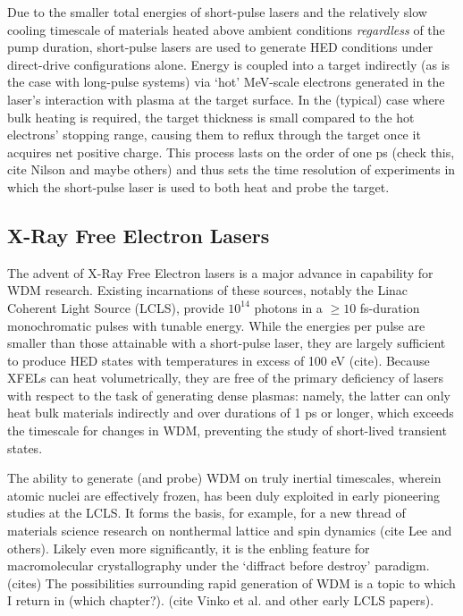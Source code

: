 Due to the smaller total energies of short-pulse lasers and the relatively slow cooling timescale of materials heated above ambient conditions \textit{regardless} of the pump duration, short-pulse lasers are used to generate HED conditions under direct-drive configurations alone. Energy is coupled into a target indirectly (as is the case with long-pulse systems) via `hot' MeV-scale electrons generated in the laser's interaction with plasma at the target surface. In the (typical) case where bulk heating is required, the target thickness is small compared to the hot electrons' stopping range, causing them to reflux through the target once it acquires net positive charge. This process lasts on the order of one ps (check this, cite Nilson and maybe others) and thus sets the time resolution of experiments in which the short-pulse laser is used to both heat and probe the target.

\label{foobar}
\subsection{X-Ray Free Electron Lasers}
The advent of X-Ray Free Electron lasers is a major advance in capability for WDM research. Existing incarnations of these sources, notably the Linac Coherent Light Source (LCLS), provide $10^{14}$ photons in a $\geq 10$ fs-duration monochromatic pulses with tunable energy. While the energies per pulse are smaller than those attainable with a short-pulse laser, they are largely sufficient to produce HED states with temperatures in excess of 100 eV (cite). Because XFELs can heat volumetrically, they are free of the primary deficiency of lasers with respect to the task of generating dense plasmas: namely, the latter can only heat bulk materials indirectly and over durations of 1 ps or longer, which exceeds the timescale for changes in WDM, preventing the study of short-lived transient states.

The ability to generate (and probe) WDM on truly inertial timescales, wherein atomic nuclei are effectively frozen, has been duly exploited in early pioneering studies at the LCLS. It forms the basis, for example, for a new thread of materials science research on nonthermal lattice and spin dynamics (cite Lee and others). Likely even more significantly, it is the enbling feature for macromolecular crystallography under the `diffract before destroy' paradigm. (cites) The possibilities surrounding rapid generation of WDM is a topic to which I return in (which chapter?). (cite Vinko et al. and other early LCLS papers).

